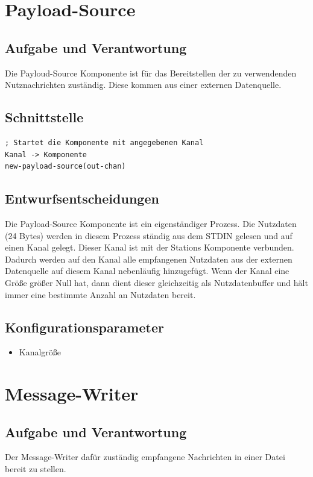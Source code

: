 \documentclass[draft=false
              ,paper=a4
              ,twoside=false
              ,fontsize=11pt
              ,headsepline
              ,BCOR10mm
              ,DIV11
              ]{scrbook}
\begin{document}
\section{Payload-Source}
\subsection{Aufgabe und Verantwortung}
Die Payloud-Source Komponente ist für das Bereitstellen der zu verwendenden Nutznachrichten zuständig. Diese kommen aus einer externen Datenquelle.

\subsection{Schnittstelle}
\begin{lstlisting}
; Startet die Komponente mit angegebenen Kanal
Kanal -> Komponente
new-payload-source(out-chan)
\end{lstlisting}

\subsection{Entwurfsentscheidungen}
Die Payload-Source Komponente ist ein eigenständiger Prozess. Die Nutzdaten (24 Bytes) werden in diesem Prozess ständig aus dem STDIN gelesen und auf einen Kanal gelegt. Dieser Kanal ist mit der Stations Komponente verbunden. Dadurch werden auf den Kanal alle empfangenen Nutzdaten aus der externen Datenquelle auf diesem Kanal nebenläufig hinzugefügt. Wenn der Kanal eine Größe größer Null hat, dann dient dieser gleichzeitig als Nutzdatenbuffer und hält immer eine bestimmte Anzahl an Nutzdaten bereit.

\subsection{Konfigurationsparameter}
\begin{itemize}
	\item Kanalgröße
\end{itemize}

\section{Message-Writer}
\subsection{Aufgabe und Verantwortung}
Der Message-Writer dafür zuständig empfangene Nachrichten in einer Datei bereit zu stellen.
\end{document}
